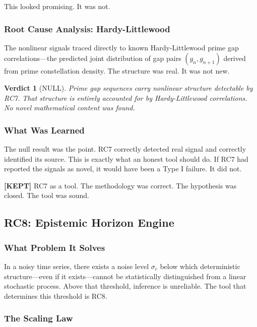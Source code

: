 \documentclass[11pt]{article}
\newtheorem{verdict}{Verdict}
\begin{document}
This looked promising. It was not.

\subsubsection{Root Cause Analysis: Hardy-Littlewood}

The nonlinear signals traced directly to known Hardy-Littlewood prime gap correlations---the predicted joint distribution of gap pairs $(g_n, g_{n+1})$ derived from prime constellation density. The structure was real. It was not new.

\begin{verdict}[\textcolor{nullred}{NULL}]
Prime gap sequences carry nonlinear structure detectable by RC7. That structure is entirely accounted for by Hardy-Littlewood correlations. No novel mathematical content was found.
\end{verdict}

\subsubsection{What Was Learned}

The null result was the point. RC7 correctly detected real signal and correctly identified its source. This is exactly what an honest tool should do. If RC7 had reported the signals as novel, it would have been a Type I failure. It did not.

\begin{graybox}
\textcolor{keepgreen}{\textbf{[KEPT]}} RC7 as a tool. The methodology was correct. The hypothesis was closed. The tool was sound.
\end{graybox}

\subsection{RC8: Epistemic Horizon Engine}

\subsubsection{What Problem It Solves}

In a noisy time series, there exists a noise level $\sigma_c$ below which deterministic structure---even if it exists---cannot be statistically distinguished from a linear stochastic process. Above that threshold, inference is unreliable. The tool that determines this threshold is RC8.

\subsubsection{The Scaling Law}
\end{document}
